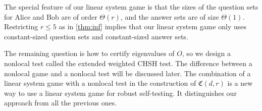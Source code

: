\documentclass[11pt,letterpaper]{article}
\newcommand{\ket}[1]{|#1\rangle}
\newcommand{\x}{\otimes}
\newcommand{\1}{\mathbb{1}}
\newcommand{\fC}{\mathfrak{C}}
\theoremstyle{definition}
\begin{document}
The special feature of our linear system game is that the sizes
of the question sets for Alice and Bob are of order $\Theta(r)$,
and the answer sets are of size $\Theta(1)$.
Restricting $r \leq 5$ as in \cref{thm:inf} implies that our linear system 
game only uses constant-sized question sets and constant-sized answer sets.



The remaining question is how to certify eigenvalues of $O$, so we
design a nonlocal test called the extended weighted CHSH test.
The difference between a nonlocal game and a nonlocal test will be discussed later.
The combination of a linear system game with 
a nonlocal test in the construction of $\fC(d,r)$ 
is a new way to use a linear system game for robust self-testing.
It distinguishes our approach from all the previous ones.
\end{document}
